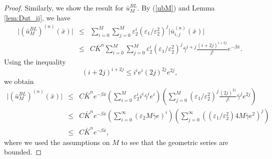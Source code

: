 \documentclass[12pt]{article}
\begin{document}
\begin{proof}
Similarly, we show the result for $\bar{u}_{M}^{BL}$. By (\ref{ubM}) and Lemma \ref{lem:Dut_ij}, we have
%
\begin{eqnarray*}
\vert (\bar{u}^{BL}_M)^{(n)} (\bar{x}) \vert  &\leq& \sum_{i=0}^M \sum_{j=0}^M \varepsilon_2^i (\varepsilon_1 / \varepsilon_2^2)^j \vert \bar{u}^{(n)}_{i,j}(\bar{x}) \vert \\
&\leq& C \bar{K}^n \sum_{i=0}^M \sum_{j=0}^M \varepsilon_2^i (\varepsilon_1 / \varepsilon_2^2)^j \bar{\gamma}^{i+j} \frac{(i+2j)^{i+2j}}{j!} e^{-\beta \bar{x} } .
\end{eqnarray*}
%
Using the inequality
%
\[
(i+2j)^{i+2j}  \leq i^i e^i (2j)^{2j} e^{2j},
\]
we obtain 
%
\begin{eqnarray*}
\vert (\bar{u}^{BL}_M)^{(n)} (\bar{x}) \vert  &\leq& C \bar{K}^n e^{-\beta \bar{x}} \left( \sum_{i=0}^M \varepsilon_2^i i^i \bar{\gamma}^i e^i \right) \left( \sum_{j=0}^M (\varepsilon_1 / \varepsilon_2^2)^j \frac{(2j)^{2j}}{j!} \bar{\gamma}^j e^{2j} \right) \\
&\leq& C \bar{K}^n e^{-\beta \bar{x}} \left( \sum_{i=0}^{\infty} (\varepsilon_2 M \bar{\gamma} e)^i \right) \left( \sum_{j=0}^{\infty} ((\varepsilon_1 / \varepsilon_2^2) 4M \bar{\gamma} e^2)^j \right) \\
&\leq& C \bar{K}^n e^{-\beta \bar{x}},
\end{eqnarray*}
%
where we used the assumptions on $M$ to see that the geometric series are bounded.


\end{proof}
\end{document}
